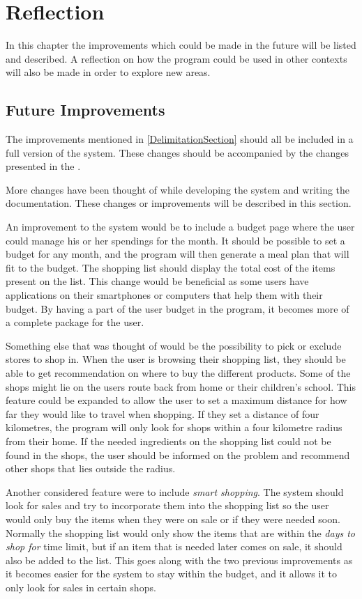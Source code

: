 \chapter{Reflection}
In this chapter the improvements which could be made in the future will be listed and described. A reflection on how the program could be used in other contexts will also be made in order to explore new areas.

\section{Future Improvements}
The improvements mentioned in \cref{DelimitationSection} should all be included in a full version of the system. These changes should be accompanied by the changes presented in the .

More changes have been thought of while developing the system and writing the documentation. These changes or improvements will be described in this section.

An improvement to the system would be to include a budget page where the user could manage his or her spendings for the month. It should be possible to set a budget for any month, and the program will then generate a meal plan that will fit to the budget. The shopping list should display the total cost of the items present on the list. This change would be beneficial as some users have applications on their smartphones or computers that help them with their budget. By having a part of the user budget in the program, it becomes more of a complete package for the user.

Something else that was thought of would be the possibility to pick or exclude stores to shop in. When the user is browsing their shopping list, they should be able to get recommendation on where to buy the different products. Some of the shops might lie on the users route back from home or their children's school. This feature could be expanded to allow the user to set a maximum distance for how far they would like to travel when shopping. If they set a distance of four kilometres, the program will only look for shops within a four kilometre radius from their home. If the needed ingredients on the shopping list could not be found in the shops, the user should be informed on the problem and recommend other shops that lies outside the radius.

Another considered feature were to include \textit{smart shopping}. The system should look for sales and try to incorporate them into the shopping list so the user would only buy the items when they were on sale or if they were needed soon. Normally the shopping list would only show the items that are within the \textit{days to shop for} time limit, but if an item that is needed later comes on sale, it should also be added to the list. This goes along with the two previous improvements as it becomes easier for the system to stay within the budget, and it allows it to only look for sales in certain shops.

